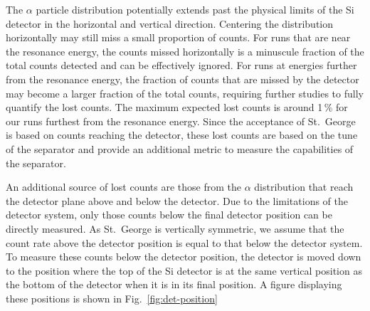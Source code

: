 The $\alpha$ particle distribution potentially extends past the physical
limits of the Si detector in the horizontal and vertical direction.
Centering the distribution horizontally may still miss a small
proportion of counts. For runs that are near the resonance energy, the
counts missed horizontally is a minuscule fraction of the total counts
detected and can be effectively ignored. For runs at energies further
from the resonance energy, the fraction of counts that are missed by the
detector may become a larger fraction of the total counts, requiring
further studies to fully quantify the lost counts. The maximum expected
lost counts is around 1\,\% for our runs furthest from the resonance
energy. Since the acceptance of St.\ George is based on counts reaching
the detector, these lost counts are based on the tune of the separator
and provide an additional metric to measure the capabilities of the
separator.

An additional source of lost counts are those from the $\alpha$
distribution that reach the detector plane above and below the detector.
Due to the limitations of the detector system, only those counts below
the final detector position can be directly measured. As St.\ George is
vertically symmetric, we assume that the count rate above the detector
position is equal to that below the detector system. To measure these
counts below the detector position, the detector is moved down to the
position where the top of the Si detector is at the same vertical
position as the bottom of the detector when it is in its final position.
A figure displaying these positions is shown in
Fig.~\ref{fig:det-position}


